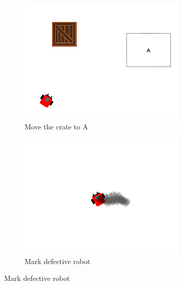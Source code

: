 \documentclass[]{article}
\begin{document}
\begin{figure}
\begin{subfigure}{0.42\textwidth}
		\includegraphics[width=\linewidth]{slide_images/Swarm_Robot_Control_-_Single_Robot_0015.png}
		\caption{Move the crate to A}
		\label{fig:sub1}
	\end{subfigure}%
	\begin{subfigure}{0.42\textwidth}
		\centering
		\includegraphics[width=\linewidth]{slide_images/Swarm_Robot_Control_-_Single_Robot_0017.png}
		\caption{Mark defective robot}
		\label{fig:sub2}
	\end{subfigure}
	\label{fig:single_robot_slides}
\end{figure}
\end{document}
